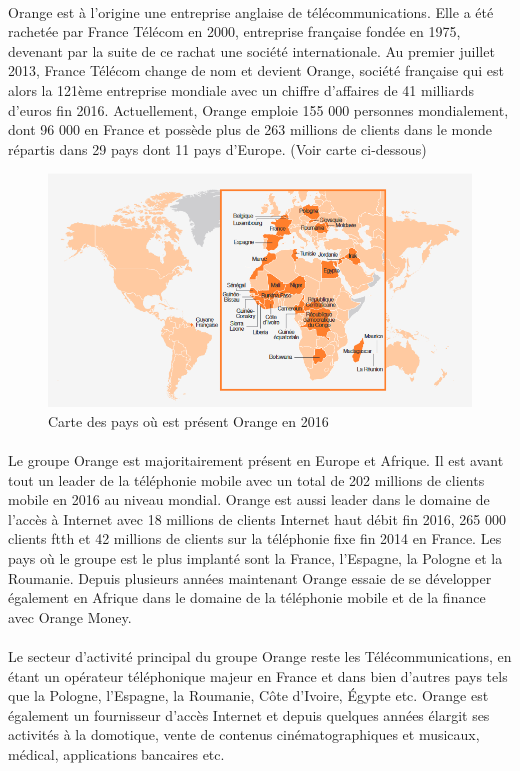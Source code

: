 \documentclass[12pt,a4paper]{report}
\begin{document}
\paragraph*{}
Orange est à l'origine une entreprise anglaise de télécommunications. Elle a été rachetée par France Télécom en 2000, entreprise française fondée en 1975, devenant par la suite de ce rachat une société internationale. Au premier juillet 2013, France Télécom change de nom et devient Orange, société française qui est alors la 121ème entreprise mondiale avec un chiffre d'affaires de 41 milliards d’euros fin 2016. Actuellement, Orange emploie 155 000 personnes mondialement, dont 96 000 en France et possède plus de 263 millions de clients dans le monde répartis dans 29 pays dont 11 pays d’Europe. (Voir carte ci-dessous)
\begin{figure}[!ht]
    \center
    \includegraphics[scale=0.75]{./img/world_orange_2016.PNG}
    \caption{Carte des pays où est présent Orange en 2016}
\end{figure}
\paragraph*{}
Le groupe Orange est majoritairement présent en Europe et Afrique. Il est avant tout un leader de la téléphonie mobile avec un total de 202 millions de clients mobile en 2016 au niveau mondial. Orange est aussi leader dans le domaine de l’accès à Internet avec 18 millions de clients Internet haut débit fin 2016, 265 000 clients \gls{ftth} et 42 millions de clients sur la téléphonie fixe fin 2014 en France. Les pays où le groupe est le plus implanté sont la France, l’Espagne, la Pologne et la Roumanie. Depuis plusieurs années maintenant Orange essaie de se développer également en Afrique dans le domaine de la téléphonie mobile et de la finance avec Orange Money.
\paragraph*{}
Le secteur d’activité principal du groupe Orange reste les Télécommunications, en étant un opérateur téléphonique majeur en France et dans bien d’autres pays tels que la Pologne, l’Espagne, la Roumanie, Côte d’Ivoire, Égypte etc. Orange est également un fournisseur d’accès Internet et depuis quelques années élargit ses activités à la domotique, vente de contenus cinématographiques et musicaux, médical, applications bancaires etc.
\end{document}
